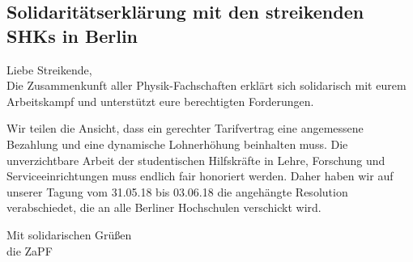 
\subsection*{Solidaritätserklärung	mit	den	streikenden	SHKs	in	Berlin}

Liebe	Streikende,\\
Die Zusammenkunft aller Physik-Fachschaften erklärt sich solidarisch mit eurem Arbeitskampf und unterstützt eure berechtigten Forderungen.

Wir	teilen	die	Ansicht,	dass	ein	gerechter	Tarifvertrag	eine	angemessene	Bezahlung	und	eine
dynamische	Lohnerhöhung	beinhalten	muss.	Die	unverzichtbare	Arbeit	der	studentischen
Hilfskräfte	in	Lehre,	Forschung	und	Serviceeinrichtungen	muss	endlich	fair honoriert	werden.
Daher	haben	wir	auf	unserer	Tagung	vom	31.05.18	bis	03.06.18	die	angehängte	Resolution
verabschiedet,	die	an	alle	Berliner	Hochschulen	verschickt	wird.

Mit	solidarischen Grüßen\\
die	ZaPF

